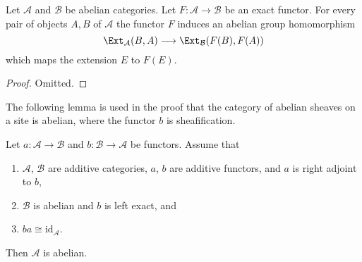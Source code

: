 \begin{lemma}
\label{lemma-exact-functor-ext}
Let $\mathcal{A}$ and $\mathcal{B}$ be abelian categories.
Let $F : \mathcal{A} \to \mathcal{B}$ be an exact functor.
For every pair of objects $A, B$ of $\mathcal{A}$ the
functor $F$ induces an abelian group homomorphism
$$
\Ext_\mathcal{A}(B, A)
\longrightarrow
\Ext_\mathcal{B}(F(B), F(A))
$$
which maps the extension $E$ to $F(E)$.
\end{lemma}

\begin{proof}
Omitted.
\end{proof}

\noindent
The following lemma is used in the proof that the category of abelian
sheaves on a site is abelian, where the functor $b$ is sheafification.

\begin{lemma}
\label{lemma-adjoint-get-abelian}
Let $a : \mathcal{A} \to \mathcal{B}$ and $b : \mathcal{B} \to \mathcal{A}$
be functors. Assume that
\begin{enumerate}
\item $\mathcal{A}$, $\mathcal{B}$ are additive categories,
$a$, $b$ are additive functors, and $a$ is right adjoint to $b$,
\item $\mathcal{B}$ is abelian and $b$ is left exact, and
\item $ba \cong \text{id}_\mathcal{A}$.
\end{enumerate}
Then $\mathcal{A}$ is abelian.
\end{lemma}

